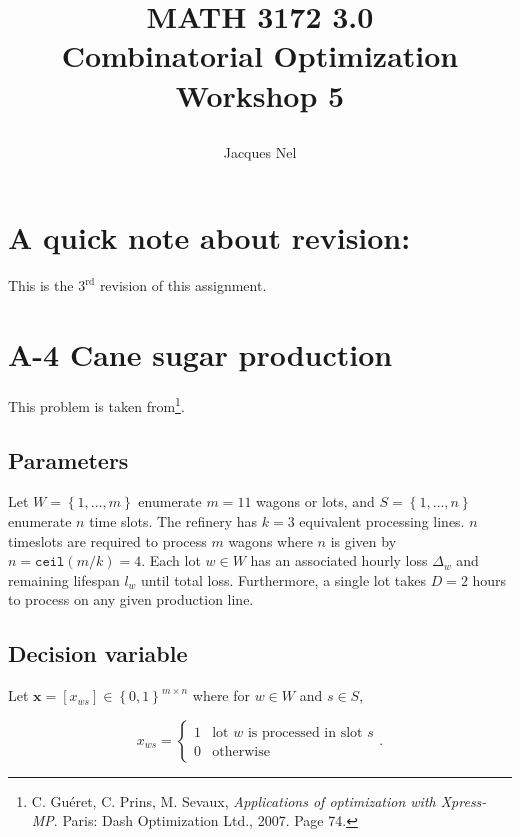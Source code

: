 \documentclass[8pt,oneside]{extarticle}
\title{{\bf MATH 3172 3.0\\ Combinatorial Optimization}\\\vspace{10pt} \large Workshop 5     
    \author{Jacques Nel}
}
\newcommand{\vect}[1]{\boldsymbol{#1}}
\begin{document}
\maketitle

\thispagestyle{empty}

\newpage


\section*{A quick note about revision:}

This is the $3^\mathrm{rd}$ revision of this assignment.

\newpage


\section{A-4 Cane sugar production}

This problem is taken from\footnote{C. Guéret, C. Prins, M. Sevaux, \textit{Applications of optimization with Xpress-MP}. %
Paris: Dash Optimization Ltd., 2007. Page 74.}.

\subsection{Parameters}

Let $W = \left\lbrace 1,\ldots, m\right\rbrace$ enumerate $m=11$ wagons or lots, and 
$S=\left\lbrace 1, \ldots, n\right\rbrace$ enumerate $n$ time slots. The refinery has $k=3$ equivalent processing lines.
$n$ timeslots are required to process $m$ wagons where $n$ is given by $n=\texttt{ceil}(m/k)=4$. 
Each lot $w\in W$ has an associated hourly loss $\Delta_w$ and remaining lifespan $l_w$ until total loss.
Furthermore, a single lot takes $D=2$ hours to process on any given production line.

\subsection{Decision variable}

Let $\vect{x} = \left[ x_{ws}\right] \in \left\lbrace 0, 1\right\rbrace^{m\times n}$
where for $w\in W$ and $s\in S$,

$$x_{ws} = \begin{cases}
    1 & \text{lot }w\text{ is processed in slot }s\\
    0 & \text{otherwise}
\end{cases}.
$$
\end{document}
